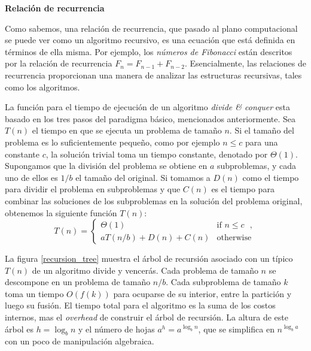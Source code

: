 \begin{flushleft}
    \textbf{Relación de recurrencia}
\end{flushleft}
 
Como sabemos, una relación de recurrencia, que pasado al plano computacional se puede ver como un algoritmo recursivo, es una ecuación
que está definida en términos de ella misma. Por ejemplo, los \textit{números de Fibonacci}\cite{sigler03} están descritos por la relación
de recurrencia $F_n = F_{n-1} + F_{n-2}$. Esencialmente, las relaciones de recurrencia proporcionan una manera de analizar las estructuras
recursivas, tales como los algoritmos.

La función para el tiempo de ejecución de un algoritmo \textit{divide \& conquer} esta basado en los tres pasos del paradigma básico,
mencionados anteriormente. Sea $T(n)$ el tiempo en que se ejecuta un problema de tamaño $n$. Si el tamaño del problema es lo suficientemente
pequeño, como por ejemplo $n \leq c$ para una constante $c$, la solución trivial toma un tiempo constante, denotado por $\Theta(1)$.
Supongamos que la división del problema se obtiene en $a$ subproblemas, y cada uno de ellos es $1/b$ el tamaño del original. Si tomamos a
$D(n)$ como el tiempo para dividir el problema en subproblemas y que $C(n)$ es el tiempo para combinar las soluciones de los subproblemas en
la solución del problema original, obtenemos la siguiente función $T(n)$:\\

\[ T(n) = \left\{ \begin{array}{ll}
         \Theta(1) & \mbox{if $n \leq c$ },\\
         aT(n/b) + D(n) + C(n) & \mbox{otherwise} \end{array} \right.
\]

La figura \ref{recursion_tree} muestra el árbol de recursión asociado con un típico $T(n)$ de un algoritmo divide y vencerás. Cada problema
de tamaño $n$ se descompone en un problema de tamaño $n/b$. Cada subproblema de tamaño $k$ toma un tiempo $O(f(k))$ para ocuparse de su
interior, entre la partición y luego su fusión. El tiempo total para el algoritmo es la suma de los costos internos, mas el
\textit{overhead} de construir el árbol de recursión. La altura de este árbol es $h = \log_b n$ y el número de hojas $a^h = a^{\log_b n}$,
que se simplifica en $n^{\log_b a}$ con un poco de manipulación algebraica.

